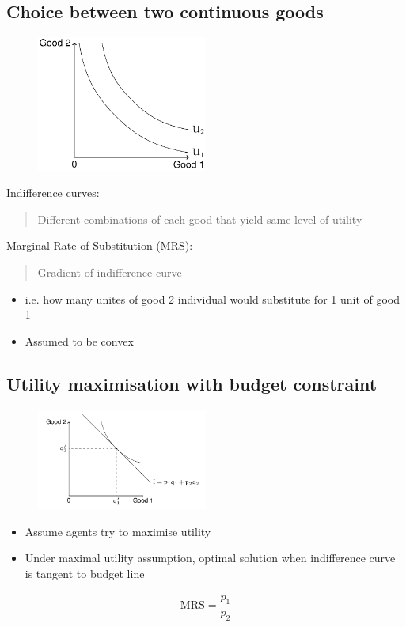 \subsection{Choice between two continuous goods}
\begin{figure}[H]
  \centering
  \includegraphics[width = 0.5\textwidth]{./img/figure4.png}
  \caption{}
\end{figure}
Indifference curves:
\begin{quote}
  Different combinations of each good that yield same level of utility
\end{quote}
Marginal Rate of Substitution (MRS):
\begin{quote}
  Gradient of indifference curve
\end{quote}
\begin{itemize}
  \item i.e. how many unites of good 2 individual would substitute for 1 unit of good 1
  \item Assumed to be convex
\end{itemize}
\subsection{Utility maximisation with budget constraint}
\begin{figure}[H]
  \centering
  \includegraphics[width = 0.5\textwidth]{./img/figure5.png}
  \caption{}
\end{figure}
\begin{itemize}
  \item Assume agents try to maximise utility
  \item Under maximal utility assumption, optimal solution when indifference curve is tangent to budget line
\end{itemize}
\begin{gather}
  \textrm{MRS} = \dfrac{p_1}{p_2}
\end{gather}
